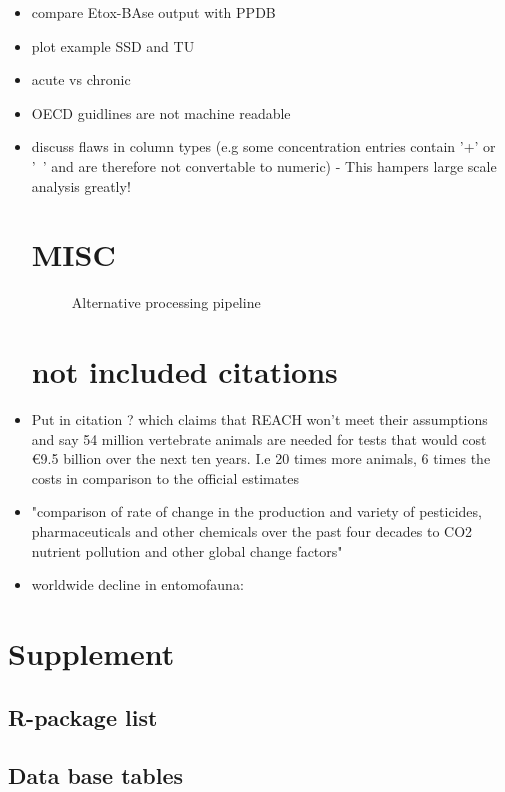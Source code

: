 \documentclass[english]{article}
\begin{document}
\begin{itemize}

\item compare Etox-BAse output with PPDB

\item plot example SSD and TU

\item acute vs chronic

\item OECD guidlines are not machine readable

\item discuss flaws in column types (e.g some concentration entries contain '+' or '~' and are therefore not convertable to numeric) - This hampers large scale analysis greatly!

\pagebreak
\section*{MISC}

\begin{figure}
    
    \caption{Alternative processing pipeline}
    \label{fig:pipeline-tree}
\end{figure}

\section*{not included citations}

\item Put in citation \citep{hartung_chemical_2009} ? which claims that REACH won't meet their assumptions and say 54 million vertebrate animals are needed for tests that would cost €9.5 billion over the next ten years. I.e 20 times more animals, 6 times the costs in comparison to the official estimates 

\item "comparison of rate of change in the production and variety of pesticides, pharmaceuticals and other chemicals over the past four decades to CO2 nutrient pollution and other global change factors" \citep{bernhardt_synthetic_2017}

\item worldwide decline in entomofauna: \citep{sanchez-bayo_worldwide_2019}


\end{itemize}

\pagebreak
\section*{Supplement}
\subsection*{R-package list} %

\pagebreak

\subsection*{Data base tables}

\end{document}
